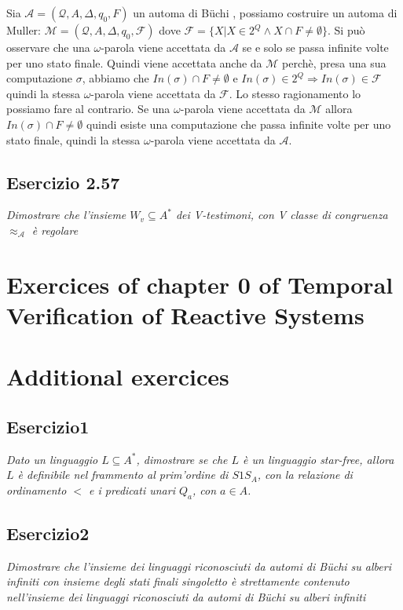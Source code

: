 \documentclass[12pt]{article}
\newcommand{\A}{\ensuremath{\mathcal{A}}\xspace}
\newcommand{\Buchi}{\ensuremath{\mathcal{A} = (\mathcal{Q},A,\Delta,q_0,F)}\xspace}
\newcommand{\buchi}{B\"uchi }
\begin{document}
Sia $\Buchi$ un automa di \buchi, possiamo costruire un automa di Muller: $\mathcal{M} = (\mathcal{Q},A,\Delta,q_0,\mathcal{F})$ dove $\mathcal{F} = \{ X | X \in 2^Q \land X \cap F \neq \emptyset\}$. Si può osservare che una $\omega$-parola viene accettata da $\A$ se e solo se passa infinite volte per uno stato finale. Quindi viene accettata anche da $\mathcal{M}$ perchè, presa una sua computazione $\sigma$, abbiamo che $In(\sigma) \cap F \neq \emptyset $ e $ In(\sigma) \in 2^Q \Rightarrow In(\sigma) \in \mathcal{F}$ quindi la stessa $\omega$-parola viene accettata da $\mathcal{F}$. Lo stesso ragionamento lo possiamo fare al contrario. Se una $\omega$-parola viene accettata da $\mathcal{M}$ allora $In(\sigma) \cap F \neq \emptyset $ quindi esiste una computazione che passa infinite volte per uno stato finale, quindi 
la stessa $\omega$-parola viene accettata da $\A$. 

\subsection*{Esercizio 2.57}
\textit{Dimostrare che l'insieme $W_v\subseteq A^*$ dei V-testimoni, con V classe di congruenza $\approx_\mathcal{A}$ è regolare}


\section{Exercices of chapter 0 of Temporal Verification of Reactive Systems}

\section{Additional exercices}
\subsection*{Esercizio1}
\textit{Dato un linguaggio $L \subseteq A^*$, dimostrare se che $L$ è un linguaggio star-free, allora $L$ è definibile nel frammento al prim'ordine di $S1S_A$, con la relazione di ordinamento $<$ e i predicati unari $Q_a$, con $a \in A$.}


\subsection*{Esercizio2}
\textit{Dimostrare che l'insieme dei linguaggi riconosciuti da automi di \buchi su alberi infiniti con insieme degli stati finali singoletto è strettamente contenuto nell'insieme dei linguaggi riconosciuti da automi di \buchi su alberi infiniti}
\end{document}
